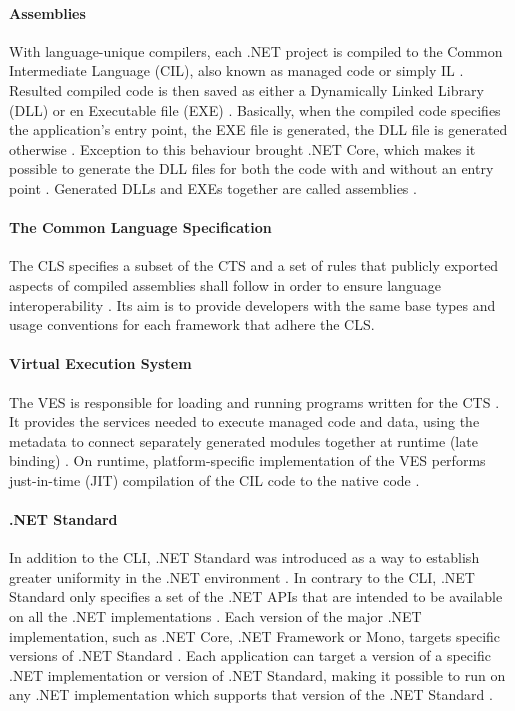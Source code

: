 \paragraph{Assemblies}
With language-unique compilers, each .NET project is compiled to the Common Intermediate Language (CIL), also known as managed code or simply IL \citep{Ecma335, ProCSharp}. Resulted compiled code is then saved as either a Dynamically Linked Library (DLL) or en Executable file (EXE) \citep{ProCSharp}. Basically, when the compiled code specifies the application's entry point, the EXE file is generated, the DLL file is generated otherwise \citep{ProCSharp}. Exception to this behaviour brought .NET Core, which makes it possible to generate the DLL files for both the code with and without an entry point \citep{microsoft.docs}. Generated DLLs and EXEs together are called assemblies \citep{ProCSharp}.

\paragraph{The Common Language Specification}
The CLS specifies a subset of the CTS and a set of rules that publicly exported aspects of compiled assemblies shall follow in order to ensure language interoperability \citep{Ecma335}. Its aim is to provide developers with the same base types and usage conventions for each framework that adhere the CLS. \citep{Ecma335}

\paragraph{Virtual Execution System}
The VES is responsible for loading and running programs written for the CTS \citep{Ecma335}. It provides the services needed to execute managed code and data, using the metadata to connect separately generated modules together at runtime (late binding) \citep{Ecma335}. On runtime, platform-specific implementation of the VES performs just-in-time (JIT) compilation of the CIL code to the native code \citep{Ecma335}.

\paragraph{.NET Standard}
In addition to the CLI, .NET Standard was introduced as a way to establish greater uniformity in the .NET environment \citep{ProCSharp}. In contrary to the CLI, .NET Standard only specifies a set of the .NET APIs that are intended to be available on all the .NET implementations \citep{microsoft.docs}. Each version of the major .NET implementation, such as .NET Core, .NET Framework or Mono, targets specific versions of .NET Standard \citep{microsoft.docs}. Each application can target a version of a specific .NET implementation or version of .NET Standard, making it possible to run on any .NET implementation which supports that version of the .NET Standard \citep{ProCSharp}.

